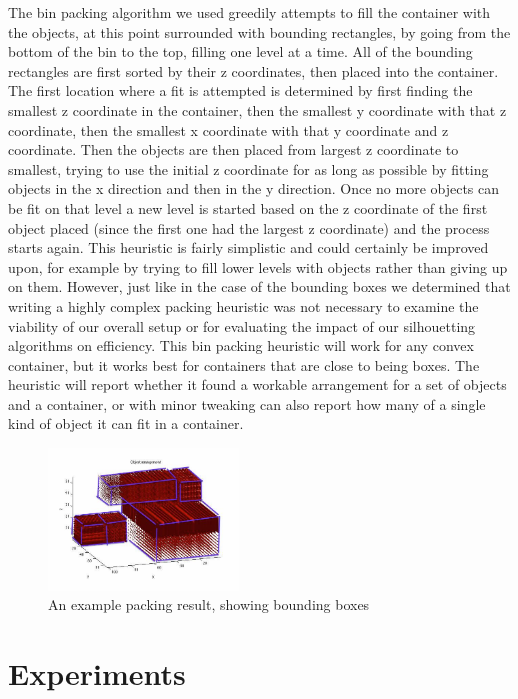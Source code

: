 \documentclass[10pt,twocolumn,letterpaper]{article}
\begin{document}
The bin packing algorithm we used greedily attempts to fill the container with the objects, at this point surrounded with bounding rectangles, by going from the bottom of the bin to the top, filling one level at a time. All of the bounding rectangles are first sorted by their z coordinates, then placed into the container. The first location where a fit is attempted is determined by first finding the smallest z coordinate in the container, then the smallest y coordinate with that z coordinate, then the smallest x coordinate with that y coordinate and z coordinate. Then the objects are then placed from largest z coordinate to smallest, trying to use the initial z coordinate for as long as possible by fitting objects in the x direction and then in the y direction. Once no more objects can be fit on that level a new level is started based on the z coordinate of the first object placed (since the first one had the largest z coordinate) and the process starts again. This heuristic is fairly simplistic and could certainly be improved upon, for example by trying to fill lower levels with objects rather than giving up on them. However, just like in the case of the bounding boxes we determined that writing a highly complex packing heuristic was not necessary to examine the viability of our overall setup or for evaluating the impact of our silhouetting algorithms on efficiency. This bin packing heuristic will work for any convex container, but it works best for containers that are close to being boxes. The heuristic will report whether it found a workable arrangement for a set of objects and a container, or with minor tweaking can also report how many of a single kind of object it can fit in a container.
    \begin{figure}[!ht]
    \centering
    \includegraphics[width=0.45\textwidth]{packingExample.jpg}
    \caption{An example packing result, showing bounding boxes}
    \end{figure}

\section{Experiments}
\end{document}

